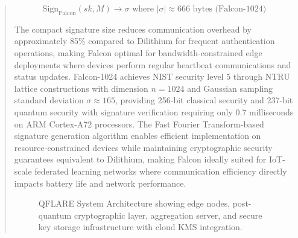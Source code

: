 \documentclass{svproc}
\begin{document}
\begin{abstract}
\begin{equation}
\text{Sign}_{\text{Falcon}}(sk, M) \rightarrow \sigma \text{ where } |\sigma| \approx 666 \text{ bytes (Falcon-1024)}
\end{equation}

The compact signature size reduces communication overhead by approximately 85\% compared to Dilithium for frequent authentication operations, making Falcon optimal for bandwidth-constrained edge deployments where devices perform regular heartbeat communications and status updates. Falcon-1024 achieves NIST security level 5 through NTRU lattice constructions with dimension $n = 1024$ and Gaussian sampling standard deviation $\sigma \approx 165$, providing 256-bit classical security and 237-bit quantum security with signature verification requiring only 0.7 milliseconds on ARM Cortex-A72 processors. The Fast Fourier Transform-based signature generation algorithm enables efficient implementation on resource-constrained devices while maintaining cryptographic security guarantees equivalent to Dilithium, making Falcon ideally suited for IoT-scale federated learning networks where communication efficiency directly impacts battery life and network performance.

\begin{figure}[t]
\centering
{}
\caption{QFLARE System Architecture showing edge nodes, post-quantum cryptographic layer, aggregation server, and secure key storage infrastructure with cloud KMS integration.}
\label{fig:architecture}
\end{figure}


\end{abstract}
\end{document}
